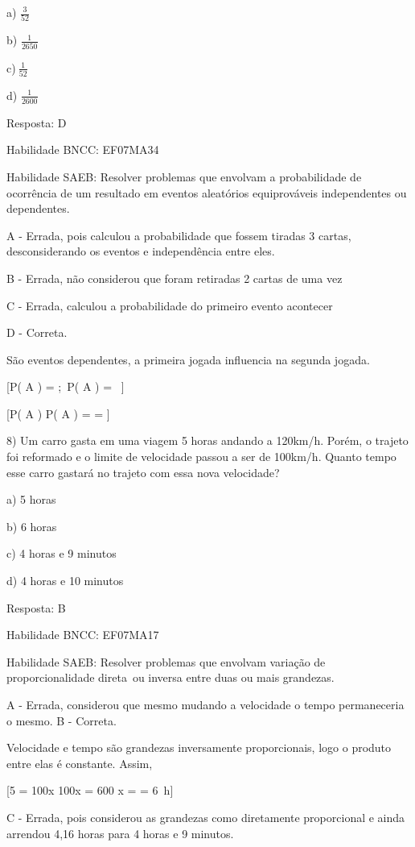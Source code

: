 a) \(\frac{3}{52}\)

b) \(\frac{1}{2650}\)

c)\(\ \frac{1}{52}\)

d) \(\frac{1}{2600}\)

Resposta: D

Habilidade BNCC: EF07MA34

Habilidade SAEB: Resolver problemas que envolvam a probabilidade de
ocorrência de um resultado em eventos aleatórios equiprováveis
independentes ou dependentes.

A - Errada, pois calculou a probabilidade que fossem tiradas 3 cartas,
desconsiderando os eventos e independência entre eles.

B - Errada, não considerou que foram retiradas 2 cartas de uma vez

C - Errada, calculou a probabilidade do primeiro evento acontecer

D - Correta.

São eventos dependentes, a primeira jogada influencia na segunda jogada.

[P\left( A \right) = ;\ P\left( A \right) = \ ]

[P\left( A \right) \times P\left( A \right) =  \times {} = ]

8) Um carro gasta em uma viagem 5 horas andando a 120km/h. Porém, o
trajeto foi reformado e o limite de velocidade passou a ser de 100km/h.
Quanto tempo esse carro gastará no trajeto com essa nova velocidade?

a) 5 horas

b) 6 horas

c) 4 horas e 9 minutos

d) 4 horas e 10 minutos

Resposta: B

Habilidade BNCC: EF07MA17

Habilidade SAEB: Resolver problemas que envolvam variação de
proporcionalidade direta~ou inversa entre duas ou mais grandezas.

A - Errada, considerou que mesmo mudando a velocidade o tempo
permaneceria o mesmo. B - Correta.

Velocidade e tempo são grandezas inversamente proporcionais, logo o
produto entre elas é constante. Assim,

[5  = 100x \rightarrow 100x = 600 \rightarrow x =  = 6\ h]

C - Errada, pois considerou as grandezas como diretamente proporcional e
ainda arrendou 4,16 horas para 4 horas e 9 minutos.

